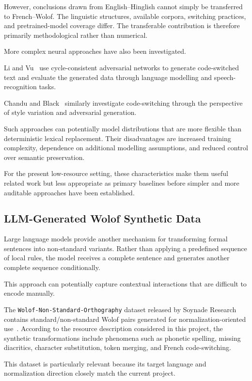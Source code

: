 \documentclass[12pt, a4paper, twoside, openany]{report}
\begin{document}
However, conclusions drawn from English--Hinglish cannot simply be transferred to French--Wolof. The linguistic structures, available corpora, switching practices, and pretrained-model coverage differ. The transferable contribution is therefore primarily methodological rather than numerical.

More complex neural approaches have also been investigated.

Li and Vu~\cite{li2020codeswitching} use cycle-consistent adversarial networks to generate code-switched text and evaluate the generated data through language modelling and speech-recognition tasks.

Chandu and Black~\cite{chandu2020style} similarly investigate code-switching through the perspective of style variation and adversarial generation.

Such approaches can potentially model distributions that are more flexible than deterministic lexical replacement. Their disadvantages are increased training complexity, dependence on additional modelling assumptions, and reduced control over semantic preservation.

For the present low-resource setting, these characteristics make them useful related work but less appropriate as primary baselines before simpler and more auditable approaches have been established.


\subsection{LLM-Generated Wolof Synthetic Data}

Large language models provide another mechanism for transforming formal sentences into non-standard variants. Rather than applying a predefined sequence of local rules, the model receives a complete sentence and generates another complete sequence conditionally.

This approach can potentially capture contextual interactions that are difficult to encode manually.

The \texttt{Wolof-Non-Standard-Orthography} dataset released by Soynade Research contains standard/non-standard Wolof pairs generated for normalization-oriented use~\cite{soynade2026dataset}. According to the resource description considered in this project, the synthetic transformations include phenomena such as phonetic spelling, missing diacritics, character substitution, token merging, and French code-switching.

This dataset is particularly relevant because its target language and normalization direction closely match the current project.
\end{document}
